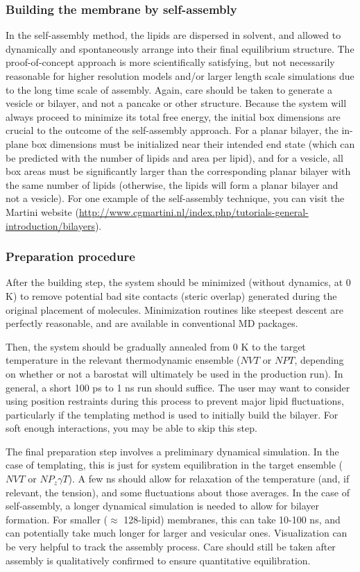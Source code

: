 \documentclass[9pt,bestpractices]{livecoms}
\begin{document}
\subsubsection{Building the membrane by self-assembly}
\label{subsubsec:selfassembly}
In the self-assembly method, the lipids are dispersed in solvent, and allowed to dynamically and spontaneously arrange into their final equilibrium structure.
The proof-of-concept approach is more scientifically satisfying, but not necessarily reasonable for higher resolution models and/or larger length scale simulations due to the long time scale of assembly.
Again, care should be taken to generate a vesicle or bilayer, and not a pancake or other structure.
Because the system will always proceed to minimize its total free energy, the initial box dimensions are crucial to the outcome of the self-assembly approach.
For a planar bilayer, the in-plane box dimensions must be initialized near their intended end state (which can be predicted with the number of lipids and area per lipid), and for a vesicle, all box areas must be significantly larger than the corresponding planar bilayer with the same number of lipids (otherwise, the lipids will form a planar bilayer and not a vesicle).
For one example of the self-assembly technique, you can visit the Martini website (\url{http://www.cgmartini.nl/index.php/tutorials-general-introduction/bilayers}).

\subsubsection{Preparation procedure}
\label{subsubsec:prepproc}
After the building step, the system should be minimized (without dynamics, at 0 K) to remove potential bad site contacts (steric overlap) generated during the original placement of molecules.
Minimization routines like steepest descent are perfectly reasonable, and are available in conventional MD packages.

Then, the system should be gradually annealed from 0 K to the target temperature in the relevant thermodynamic ensemble ($NVT$ or $NPT$, depending on whether or not a barostat will ultimately be used in the production run).
In general, a short 100 ps to 1 ns run should suffice.
The user may want to consider using position restraints during this process to prevent major lipid fluctuations, particularly if the templating method is used to initially build the bilayer.
For soft enough interactions, you may be able to skip this step.

The final preparation step involves a preliminary dynamical simulation.
In the case of templating, this is just for system equilibration in the target ensemble ($NVT$ or $NP_z \gamma T$).
A few ns should allow for relaxation of the temperature (and, if relevant, the tension), and some fluctuations about those averages.
In the case of self-assembly, a longer dynamical simulation is needed to allow for bilayer formation.
For smaller ($\approx$ 128-lipid) membranes, this can take 10-100 ns, and can potentially take much longer for larger and vesicular ones.
Visualization can be very helpful to track the assembly process.
Care should still be taken after assembly is qualitatively confirmed to ensure quantitative equilibration.
\end{document}

